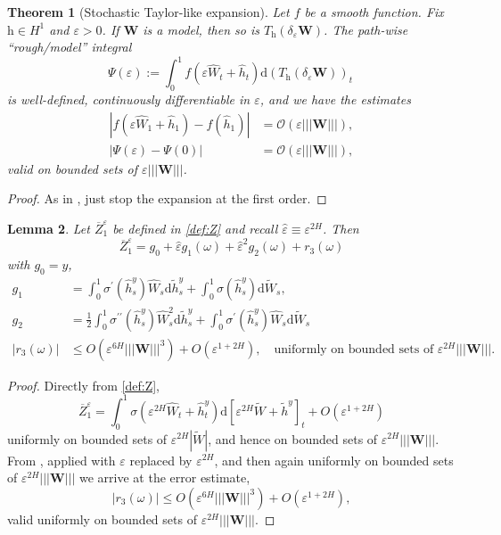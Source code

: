 \documentclass[11pt]{article}
\theoremstyle{plain}
\newtheorem{theorem}{Theorem}[section]
\newtheorem{lemma}[theorem]{Lemma}
\theoremstyle{definition}
\theoremstyle{remark}
\renewcommand{\bar}{\overline}
\renewcommand{\tilde}{\widetilde}
\renewcommand{\hat}{\widehat}
\newcommand{\dd}{\mathrm{d}}
\newcommand{\1}{\mathbf{1}}
\numberwithin{equation}{section}
\def\eps{\varepsilon}
\def\s{\sigma}
\def\WW{\mathbf W}
\def\h{\mathrm h}
\begin{document}
\begin{theorem}[Stochastic Taylor-like expansion]\label{thm:remainder:estimate}
Let $f$ be a smooth function. Fix $\h \in H^1$ and $ \eps >0$. If $\WW$ is a model, then so is $T_{\h} ( \delta_{\eps} \WW)$. 
The path-wise ``rough/model'' integral 
$$
\Psi(\eps) :=  \int_{0}^1 f \left( \eps \hat W_t + \hat{h}_t \right) 
\dd (T_{\h} ( \delta_{\eps} \WW))_t \ 
$$
is well-defined, continuously differentiable in $\eps$, and we have the estimates
\[
\begin{split}
|f(\eps\hat W_1 + \hat h_1) -
f(\hat h_1)|&=\mathcal{O}(\eps |||\WW||| ), \\
| \Psi(\eps) - \Psi(0) | &= \mathcal{O} (\eps ||| \WW ||| ),
\end{split}
\] 
valid on bounded sets of $\eps ||| \WW |||$.
\end{theorem}
\begin{proof}
As in \cite[Theorem B.6]{friz2018precise1}, just stop the expansion at the first order.
\end{proof}


\begin{lemma}
Let $\bar{Z}_1^\eps$ be defined in \eqref{def:Z} and recall $\hat \eps \equiv \eps^{2H}$. Then
\begin{equation}\label{taylor:expansion}
\bar{Z}_1^\eps=  g_0 + \hat \eps g_1 (\omega) + \hat \eps^2 g_2 (\omega) + r_3(\omega)
\end{equation}
with $g_0=y$,
\begin{align}
 \label{def:g1} 
g_1 
&= \int_0^1 \sigma^{\prime}(\hat{h}_s^y) \hat{W}_s \dd \tilde{h}_s^y 
+ \int_0^1 \sigma(\hat{h}_s^y) \dd \tilde{W}_s,
\\
\label{def:g2}
g_2 
&=
 \frac{1}{2}\int_0^1 \sigma^{\prime\prime}(\hat{h}_s^y) \hat{W}^2_s \dd \tilde{h}_s^y + \int_0^1\sigma^{\prime}(\hat{h}_s^y) \hat{W}_s \dd \tilde{W}_s
\\
\label{eq:r}
 | r_3 (\omega ) | & \le O (\eps^{6H}  ||| \WW |||^3) + O (\eps^{1+2H}),
\quad\mbox{uniformly on bounded sets of $\eps^{2H} ||| \WW |||$.}\end{align}
\end{lemma}
\begin{proof}
Directly from \eqref{def:Z},
$$
\bar{Z}_1^\eps=\int_0^1\s \left( \eps^{2H} \hat W_t+\hat h_t^y\right)
\dd [ \eps^{2H} \tilde W + \tilde h^y ]_t
+ O (\eps^{1+2H})
$$
uniformly on bounded sets of $\eps^{2H} |\tilde W|$, and hence on bounded sets of $\eps^{2H} ||| \WW |||$.
From \cite[Theorem B.6]{friz2018precise1}, applied with $\eps$ replaced by $\eps^{2H}$, and then again uniformly on bounded sets of $\eps^{2H} ||| \WW |||$
we arrive at the error estimate, 
$$
              | r_3 (\omega ) |  \le O (\eps^{6H}  ||| \WW |||^3) + O (\eps^{1+2H}),
$$
valid uniformly on bounded sets of $\eps^{2H} ||| \WW |||$.
\end{proof}
\end{document}
